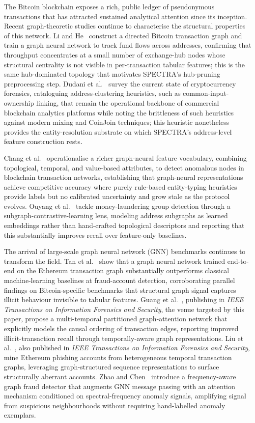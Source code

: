 \documentclass[journal]{IEEEtran}
\newcommand{\spectra}{\textsc{SPECTRA}}
\begin{document}
The Bitcoin blockchain exposes a rich, public ledger of pseudonymous
transactions that has attracted sustained analytical attention since its
inception.  Recent graph-theoretic studies continue to characterise the
structural properties of this network.  Li and He~\cite{Li2023} construct a
directed Bitcoin transaction graph and train a graph neural network to track
fund flows across addresses, confirming that throughput concentrates at a
small number of exchange-hub nodes whose structural centrality is not visible
in per-transaction tabular features; this is the same hub-dominated topology
that motivates \spectra{}'s hub-pruning preprocessing step.  Dudani et
al.~\cite{Dudani2023} survey the current state of cryptocurrency forensics,
cataloguing address-clustering heuristics, such as common-input-ownership
linking, that remain the operational backbone of commercial blockchain
analytics platforms while noting the brittleness of such heuristics against
modern mixing and CoinJoin techniques; this heuristic nonetheless provides
the entity-resolution substrate on which \spectra{}'s address-level feature
construction rests.

Chang et al.~\cite{Chang2025} operationalise a richer graph-neural feature
vocabulary, combining topological, temporal, and value-based attributes, to
detect anomalous nodes in blockchain transaction networks, establishing that
graph-neural representations achieve competitive accuracy where purely
rule-based entity-typing heuristics provide labels but no calibrated
uncertainty and grow stale as the protocol evolves.  Ouyang et
al.~\cite{Ouyang2024} tackle money-laundering group detection through a
subgraph-contrastive-learning lens, modeling address subgraphs as learned
embeddings rather than hand-crafted topological descriptors and reporting
that this substantially improves recall over feature-only baselines.

The arrival of large-scale graph neural network (GNN) benchmarks continues to
transform the field.  Tan et al.~\cite{Tan2023} show that a graph neural
network trained end-to-end on the Ethereum transaction graph substantially
outperforms classical machine-learning baselines at fraud-account detection,
corroborating parallel findings on Bitcoin-specific benchmarks that structural
graph signal captures illicit behaviour invisible to tabular features.  Guang et
al.~\cite{Guang2025}, publishing in \emph{IEEE Transactions on Information
Forensics and Security}, the venue targeted by this paper, propose a multi-temporal
partitioned graph-attention network that explicitly models the causal ordering
of transaction edges, reporting improved illicit-transaction recall through
temporally-aware graph representations.  Liu et al.~\cite{LiuJ2025}, also
published in \emph{IEEE Transactions on Information Forensics and Security},
mine Ethereum phishing accounts from heterogeneous temporal transaction graphs,
leveraging graph-structured sequence representations to surface structurally
aberrant accounts.  Zhao and Chen~\cite{ZhaoW2026} introduce a frequency-aware
graph fraud detector that augments GNN message passing with an
attention mechanism conditioned on spectral-frequency anomaly signals,
amplifying signal from suspicious neighbourhoods without requiring
hand-labelled anomaly exemplars.
\end{document}
